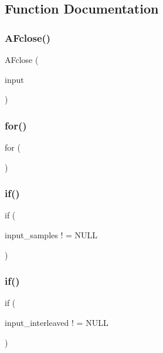 \subsection{Function Documentation}
\mbox{\label{sac__decoder_8c_abbdb62f5dce5d549d45d417e47c0bd82}} 
\subsubsection{A\+Fclose()}
{\footnotesize\ttfamily A\+Fclose (\begin{DoxyParamCaption}\item[{input}]{ }\end{DoxyParamCaption})}

\mbox{\label{sac__decoder_8c_aa4be93f1e86df34d77561524747911a1}} 
\subsubsection{for()}
{\footnotesize\ttfamily for (\begin{DoxyParamCaption}{ }\end{DoxyParamCaption})}

\mbox{\label{sac__decoder_8c_a4886878a85e5c08aa353bdec90d702db}} 
\subsubsection{if()\hspace{0.1cm}{\footnotesize\ttfamily [1/4]}}
{\footnotesize\ttfamily if (\begin{DoxyParamCaption}\item[{input\+\_\+samples !}]{ = {\ttfamily NULL} }\end{DoxyParamCaption})}

\mbox{\label{sac__decoder_8c_a16c12acc93abe028863508fe88aa1f53}} 
\subsubsection{if()\hspace{0.1cm}{\footnotesize\ttfamily [2/4]}}
{\footnotesize\ttfamily if (\begin{DoxyParamCaption}\item[{input\+\_\+interleaved !}]{ = {\ttfamily NULL} }\end{DoxyParamCaption})}

